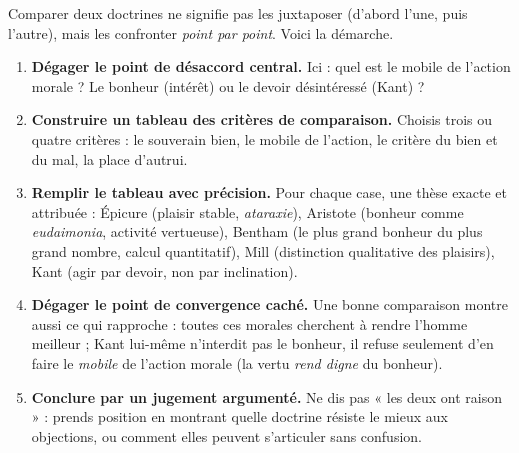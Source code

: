 \documentclass[11pt]{article}
\begin{document}
\begin{methode}
Comparer deux doctrines ne signifie pas les juxtaposer (d'abord l'une, puis l'autre), mais les confronter \emph{point par point}. Voici la démarche.
\begin{enumerate}
\item \textbf{Dégager le point de désaccord central.} Ici : quel est le mobile de l'action morale ? Le bonheur (intérêt) ou le devoir désintéressé (Kant) ?
\item \textbf{Construire un tableau des critères de comparaison.} Choisis trois ou quatre critères : le souverain bien, le mobile de l'action, le critère du bien et du mal, la place d'autrui.
\item \textbf{Remplir le tableau avec précision.} Pour chaque case, une thèse exacte et attribuée : Épicure (plaisir stable, \emph{ataraxie}), Aristote (bonheur comme \emph{eudaimonia}, activité vertueuse), Bentham (le plus grand bonheur du plus grand nombre, calcul quantitatif), Mill (distinction qualitative des plaisirs), Kant (agir par devoir, non par inclination).
\item \textbf{Dégager le point de convergence caché.} Une bonne comparaison montre aussi ce qui rapproche : toutes ces morales cherchent à rendre l'homme meilleur ; Kant lui-même n'interdit pas le bonheur, il refuse seulement d'en faire le \emph{mobile} de l'action morale (la vertu \emph{rend digne} du bonheur).
\item \textbf{Conclure par un jugement argumenté.} Ne dis pas « les deux ont raison » : prends position en montrant quelle doctrine résiste le mieux aux objections, ou comment elles peuvent s'articuler sans confusion.
\end{enumerate}
\end{methode}
\end{document}
